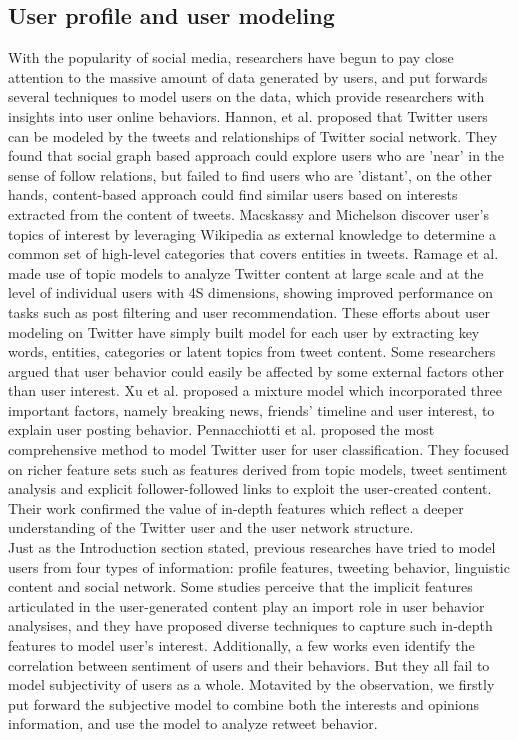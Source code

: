 \documentclass{acm_proc_article-sp}
\begin{document}
\subsection{User profile and user modeling}
With the popularity of social media, researchers have begun to pay close attention to the massive amount of data generated by users, and put forwards several techniques to model users on the data, which provide researchers with insights into user online behaviors. 
Hannon, et al.\cite{Hannon:2010} proposed that Twitter users can be modeled by the tweets and relationships of Twitter social network.
They found that social graph based approach could explore users who are ’near’ in the sense of follow relations, but failed to find users who are ’distant’, on the other hands, content-based approach could find similar users based on interests extracted from the content of tweets. 
Macskassy and Michelson\cite{conf/icwsm/MacskassyM11} discover user’s topics of interest by leveraging Wikipedia as external knowledge to determine a common set of high-level categories that covers entities in tweets. 
Ramage et al.\cite{RamageEtAl:10} made use of topic models to analyze Twitter content at large scale and at the level of individual users with 4S dimensions, showing improved performance on tasks such as post filtering and user recommendation. 
These efforts about user modeling on Twitter have simply built model for each user by extracting key words, entities, categories or latent topics from tweet content. 
Some researchers argued that user behavior could easily be affected by some external factors other than user interest.
Xu et al.\cite{Xu:2012MUP} proposed a mixture model which incorporated three important factors, namely breaking news, friends’ timeline and user interest, to explain user posting behavior.
Pennacchiotti et al.\cite{Pennacchiotti:icwsm11} proposed the most comprehensive method to model Twitter user for user classification. They focused on richer feature sets such as features derived from topic models, tweet sentiment analysis and explicit follower-followed links to exploit the user-created content. 
Their work confirmed the value of in-depth features which reflect a deeper understanding of the Twitter user and the user network structure.\\
Just as the Introduction section stated, previous researches have tried to model users from four types of information: profile features, tweeting behavior, linguistic content and social network. 
Some studies perceive that the implicit features articulated in the user-generated content play an import role in user behavior analysises,  and they have proposed diverse techniques to capture such in-depth features to model user's interest. 
Additionally, a few works even identify the correlation between sentiment of users and their behaviors.
But they all fail to model subjectivity of users as a whole.
Motavited by the observation, we firstly put forward the subjective model to combine both the interests and opinions information, and use the model to analyze  retweet behavior. 
\end{document}
